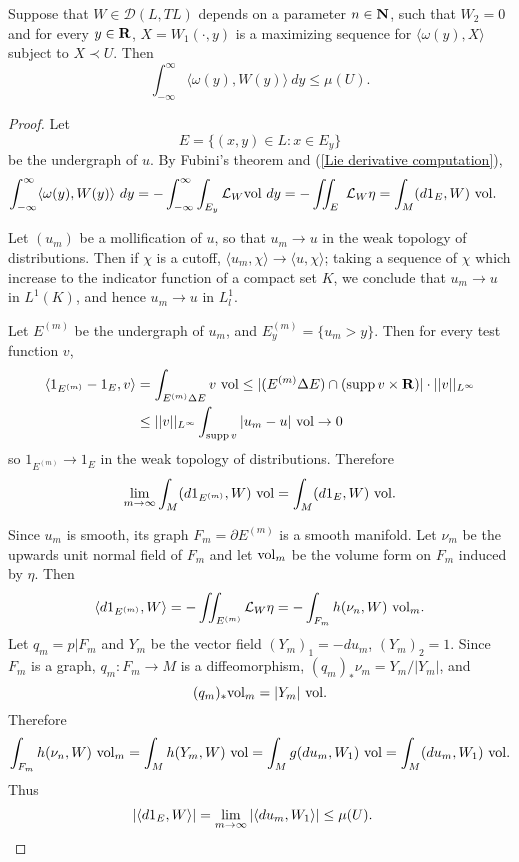 \begin{lemma}\label{coarea converse}
Suppose that $W \in \mathcal D(L, TL)$ depends on a parameter $n \in \mathbf{N}$, such that $W_2 = 0$ and for every $y \in \mathbf{R}$, $X = W_1(\cdot, y)$ is a maximizing sequence for $\langle \omega(y), X\rangle$ subject to $X \prec U$.
Then
$$\int_{-\infty}^\infty \langle \omega(y), W(y)\rangle ~dy \leq \mu(U).$$
\end{lemma}
\begin{proof}
Let
$$E = \{(x, y) \in L: x \in E_y\}$$
be the undergraph of $u$.
By Fubini's theorem and (\ref{Lie derivative computation}),
\begin{align*}
\int_{-\infty}^\infty \langle \omega(y), W(y)\rangle ~dy &= -\int_{-\infty}^\infty \int_{E_y} \mathcal L_W\mathrm{vol} ~dy = -\iint_E ~\mathcal L_W\eta = \int_M (d1_E, W) ~\mathrm{vol}.
\end{align*}

Let $(u_m)$ be a mollification of $u$, so that $u_m \to u$ in the weak topology of distributions.
Then if $\chi$ is a cutoff, $\langle u_m, \chi\rangle \to \langle u, \chi\rangle$; taking a sequence of $\chi$ which increase to the indicator function of a compact set $K$, we conclude that $u_m \to u$ in $L^1(K)$, and hence $u_m \to u$ in $L^1_l$.

Let $E^{(m)}$ be the undergraph of $u_m$, and $E^{(m)}_y = \{u_m > y\}$.
Then for every test function $v$,
\begin{align*}
\langle 1_{E^{(m)}} - 1_E, v\rangle &= \int_{E^{(m)} \Delta E} v ~\mathrm{vol} \leq |(E^{(m)} \Delta E) \cap (\operatorname{supp} v \times \mathbf{R})| \cdot ||v||_{L^\infty}\\
&\leq ||v||_{L^\infty} \int_{\operatorname{supp} v} |u_m - u| ~\mathrm{vol} \to 0
\end{align*}
so $1_{E^{(m)}} \to 1_E$ in the weak topology of distributions.
Therefore
$$\lim_{m \to \infty} \int_M (d1_{E^{(m)}}, W) ~\mathrm{vol} = \int_M (d1_E, W) ~\mathrm{vol}.$$

Since $u_m$ is smooth, its graph $F_m = \partial E^{(m)}$ is a smooth manifold.
Let $\nu_m$ be the upwards unit normal field of $F_m$ and let $\mathrm{vol}_m$ be the volume form on $F_m$ induced by $\eta$.
Then
$$\langle d 1_{E^{(m)}}, W\rangle = -\iint_{E^{(m)}} \mathcal L_W\eta = -\int_{F_m} h(\nu_n, W) ~\mathrm{vol}_m.$$
Let $q_m = p|F_m$ and $Y_m$ be the vector field $(Y_m)_1 = -d u_m$, $(Y_m)_2 = 1$.
Since $F_m$ is a graph, $q_m: F_m \to M$ is a diffeomorphism, $(q_m)_*\nu_m = Y_m/|Y_m|$, and
$$(q_m)_* \mathrm{vol}_m = |Y_m| ~\mathrm{vol}.$$
Therefore
$$\int_{F_m} h(\nu_n, W) ~\mathrm{vol}_m = \int_M h(Y_m, W) ~\mathrm{vol} = \int_M g(d u_m, W_1) ~\mathrm{vol} = \int_M (d u_m, W_1) ~\mathrm{vol}.$$
Thus
\begin{align*}
|\langle d 1_E, W\rangle| &= \lim_{m \to \infty} |\langle d u_m, W_1\rangle| \leq \mu(U). \qedhere
\end{align*}
\end{proof}

